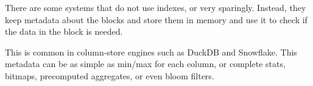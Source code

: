 There are some systems that do not use indexes, or very sparingly.
Instead, they keep metadata about the blocks and store them in memory and use it to check if the data in the block is needed.

This is common in column-store engines such as DuckDB and Snowflake.
This metadata can be as simple as min/max for each column,
or complete stats, bitmaps, precomputed aggregates, or even bloom filters.
